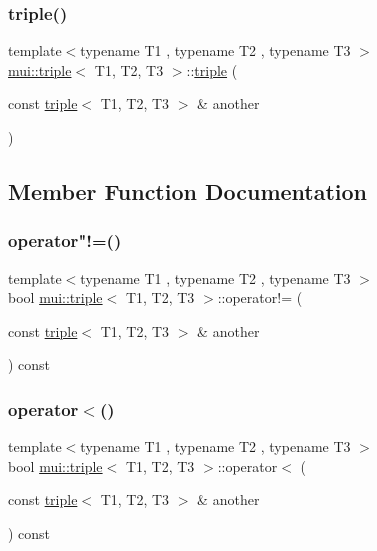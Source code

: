 \subsubsection{\texorpdfstring{triple()}{triple()}\hspace{0.1cm}{\footnotesize\ttfamily [3/3]}}
{\footnotesize\ttfamily template$<$typename T1 , typename T2 , typename T3 $>$ \\
\hyperlink{structmui_1_1triple}{mui\+::triple}$<$ T1, T2, T3 $>$\+::\hyperlink{structmui_1_1triple}{triple} (\begin{DoxyParamCaption}\item[{const \hyperlink{structmui_1_1triple}{triple}$<$ T1, T2, T3 $>$ \&}]{another }\end{DoxyParamCaption})\hspace{0.3cm}{\ttfamily [inline]}}



\subsection{Member Function Documentation}
\mbox{\label{structmui_1_1triple_a229f081bf54be89f215591c04fe590b3}} 
\subsubsection{\texorpdfstring{operator"!=()}{operator!=()}}
{\footnotesize\ttfamily template$<$typename T1 , typename T2 , typename T3 $>$ \\
bool \hyperlink{structmui_1_1triple}{mui\+::triple}$<$ T1, T2, T3 $>$\+::operator!= (\begin{DoxyParamCaption}\item[{const \hyperlink{structmui_1_1triple}{triple}$<$ T1, T2, T3 $>$ \&}]{another }\end{DoxyParamCaption}) const\hspace{0.3cm}{\ttfamily [inline]}}

\mbox{\label{structmui_1_1triple_aec87abdf489f0ab9c9aeb7b5b32a83e3}} 
\subsubsection{\texorpdfstring{operator$<$()}{operator<()}}
{\footnotesize\ttfamily template$<$typename T1 , typename T2 , typename T3 $>$ \\
bool \hyperlink{structmui_1_1triple}{mui\+::triple}$<$ T1, T2, T3 $>$\+::operator$<$ (\begin{DoxyParamCaption}\item[{const \hyperlink{structmui_1_1triple}{triple}$<$ T1, T2, T3 $>$ \&}]{another }\end{DoxyParamCaption}) const\hspace{0.3cm}{\ttfamily [inline]}}

